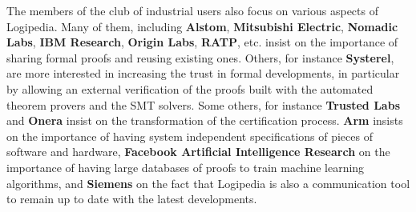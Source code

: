 The members of the club of industrial users also focus on various
aspects of Logipedia. Many of them, including {\bf Alstom}, {\bf
  Mitsubishi Electric}, {\bf Nomadic Labs}, {\bf IBM Research}, {\bf
  Origin Labs}, {\bf RATP}, etc.  insist on the importance of sharing
formal proofs and reusing existing ones.  Others, for instance
{\bf Systerel}, are more interested in increasing the trust in formal
developments, in particular by allowing an external verification of
the proofs built with the automated theorem provers and the SMT solvers.
Some others, for instance {\bf Trusted Labs} and {\bf Onera} insist
on the transformation of the certification process.
{\bf Arm} insists on the importance of having system independent
specifications of pieces of software and hardware, {\bf Facebook
  Artificial Intelligence Research} on the importance of having large
databases of proofs to train machine learning algorithms, and {\bf
  Siemens} on the fact that Logipedia is also a communication tool to
remain up to date with the latest developments.

\newcommand\couic[1]{}

